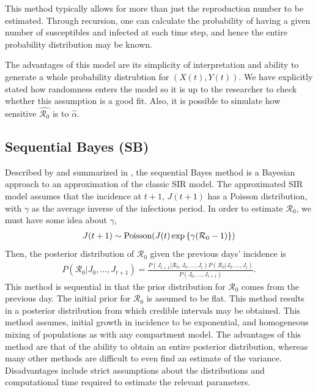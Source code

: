 \documentclass[12pt]{article}
\newcommand{\rr}{\ensuremath{\mathcal{R}_0}}
\begin{document}
This method typically allows for more than just the reproduction number to be estimated.  Through recursion, one can calculate the probability of having a given number of susceptibles and infected at each time step, and hence the entire probability distribution may be known.

The advantages of this model are its simplicity of interpretation and ability to generate a whole probability distrubtion for $(X(t), Y(t))$.  We have explicitly stated how randomness enters the model so it is up to the researcher to check whether this assumption is a good fit.  Also, it is possible to simulate how sensitive $\hat{\rr}$ is to $\hat{\alpha}$.





\subsection{Sequential Bayes (SB)}\label{sec:seqbayes}

Described by \cite{bettencourt2008} and summarized in \cite{obadia2012r0}, the sequential Bayes method is a Bayesian approach to an approximation of the classic SIR model.  The approximated SIR model assumes that the incidence at $t+1$, $J(t+1)$ has a Poisson distribution, with $\gamma$ as the  average inverse of the infectious period. In order to estimate $\rr$, we must have some idea about $\gamma$,
\begin{align*}
J(t+1)  \sim \textnormal{Poisson}( J(t) \exp \left \{  \gamma (\rr-1)\right \})
\end{align*}
Then, the posterior distribution of $\rr$ given the previous days' incidence is
\begin{align*}
  P(\rr | J_0, \dots, J_{t+1}) = \frac{P(J_{t+1} | \rr, J_0, \dots, J_t)P(\rr| J_0, \dots, J_t)}{P(J_0, \dots, J_{t+1})}.
\end{align*}
This method is sequential in that the prior distribution for $\rr$ comes from the previous day.  The initial prior for $\rr$ is assumed to be flat.  This method results in a posterior distribution from which credible intervals may be obtained.  This method assumes, initial growth in incidence to be exponential, and homogeneous mixing of populations as with any compartment model.  The advantages of this method are that of the ability to obtain an entire posterior distribution, whereas many other methods are difficult to even find an estimate of the variance.  Disadvantages include strict assumptions about the distributions and computational time required to estimate the relevant parameters.
\end{document}
